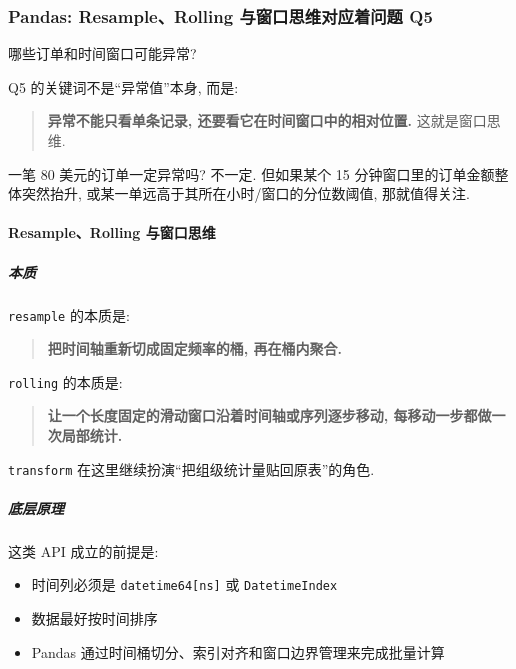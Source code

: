 \documentclass[11pt]{article}
\providecommand{\tightlist}{%
      \setlength{\itemsep}{0pt}\setlength{\parskip}{0pt}}
\begin{document}
    \subsubsection{Pandas: Resample、Rolling 与窗口思维对应着问题
Q5}\label{pandas-resamplerolling-ux4e0eux7a97ux53e3ux601dux7ef4ux5bf9ux5e94ux7740ux95eeux9898-q5}

    哪些订单和时间窗口可能异常?

Q5 的关键词不是``异常值''本身, 而是:

\begin{quote}
\textbf{异常不能只看单条记录, 还要看它在时间窗口中的相对位置.}
这就是窗口思维.
\end{quote}

一笔 80 美元的订单一定异常吗? 不一定. 但如果某个 15
分钟窗口里的订单金额整体突然抬升,
或某一单远高于其所在小时/窗口的分位数阈值, 那就值得关注.

    \paragraph{Resample、Rolling
与窗口思维}\label{resamplerolling-ux4e0eux7a97ux53e3ux601dux7ef4}

    \subparagraph{本质}\label{ux672cux8d28}

    \texttt{resample} 的本质是:

\begin{quote}
\textbf{把时间轴重新切成固定频率的桶, 再在桶内聚合.}
\end{quote}

\texttt{rolling} 的本质是:

\begin{quote}
\textbf{让一个长度固定的滑动窗口沿着时间轴或序列逐步移动,
每移动一步都做一次局部统计.}
\end{quote}

\texttt{transform} 在这里继续扮演``把组级统计量贴回原表''的角色.

    \subparagraph{底层原理}\label{ux5e95ux5c42ux539fux7406}

    这类 API 成立的前提是:

\begin{itemize}
\tightlist
\item
  时间列必须是 \texttt{datetime64{[}ns{]}} 或 \texttt{DatetimeIndex}
\item
  数据最好按时间排序
\item
  Pandas 通过时间桶切分、索引对齐和窗口边界管理来完成批量计算
\end{itemize}
\end{document}
